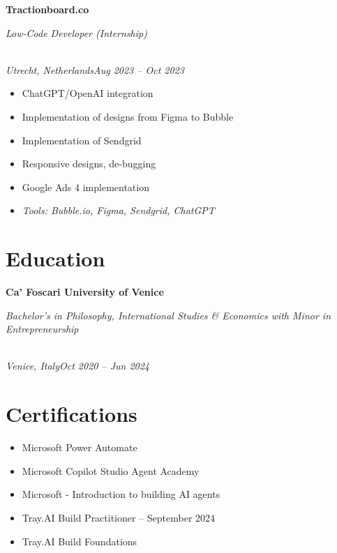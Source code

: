 \documentclass[a4paper,10pt]{article}
\newcommand{\role}[4]{\vspace{3pt}\noindent\hspace{0.6em}\parbox[t]{0.38\textwidth}{\raggedright\textbf{#1}}\hfill\parbox[t]{0.58\textwidth}{\raggedleft\textit{#2}}\\{\textit{#3}\hfill\textit{#4}}\vspace{1pt}}
\begin{document}
\role{Tractionboard.co}{Low-Code Developer (Internship)}{Utrecht, Netherlands}{Aug 2023 -- Oct 2023}
\begin{itemize}
\item ChatGPT/OpenAI integration
\item Implementation of designs from Figma to Bubble
\item Implementation of Sendgrid
\item Responsive designs, de-bugging
\item Google Ads 4 implementation
\item \textit{Tools: Bubble.io, Figma, Sendgrid, ChatGPT}
\end{itemize}

\section{Education}
\role{Ca' Foscari University of Venice}{Bachelor's in Philosophy, International Studies \& Economics with Minor in Entrepreneurship}{Venice, Italy}{Oct 2020 -- Jun 2024}

\section{Certifications}
\begin{itemize}
\item Microsoft Power Automate
\item Microsoft Copilot Studio Agent Academy
\item Microsoft - Introduction to building AI agents
\item Tray.AI Build Practitioner -- September 2024
\item Tray.AI Build Foundations
\end{itemize}
\end{document}
